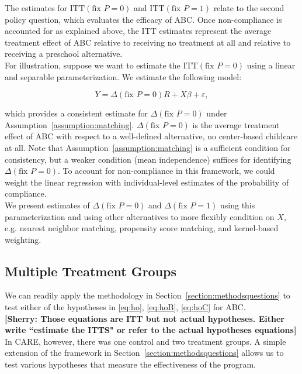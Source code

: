 \noindent The estimates for $\text{ITT} \left( \text{fix } P = 0 \right) $ and $\text{ITT} \left( \text{fix } P = 1 \right)$ relate to the second policy question, which evaluates the efficacy of ABC. Once non-compliance is accounted for as explained above, the ITT estimates represent the average treatment effect of ABC relative to receiving no treatment at all and relative to receiving a preschool alternative.\\

\noindent For illustration, suppose we want to estimate the $\text{ITT} \left( \text{fix } P = 0 \right)$ using a linear and separable parameterization. We estimate the following model: 

\begin{equation}
Y = \Delta \left( \text{fix } P = 0 \right) R + X \beta + \varepsilon, 
\end{equation}

\noindent which provides a consistent estimate for $\Delta \left( \text{fix } P = 0 \right)$ under Assumption~\ref{assumption:matching}. $\Delta \left( \text{fix } P = 0 \right)$ is the average treatment effect of ABC with respect to a well-defined alternative, no center-based childcare at all. Note that Assumption~\ref{assumption:matching} is a sufficient condition for consistency, but a weaker condition (mean independence) suffices for identifying $\Delta \left( \text{fix } P = 0 \right)$. To account for non-compliance in this framework, we could weight the linear regression with individual-level estimates of the probability of compliance.\\

\noindent We present estimates of $\Delta \left( \text{fix } P = 0 \right)$ and $\Delta \left( \text{fix } P = 1 \right)$ using this parameterization and using other alternatives to more flexibly  condition on $X$, e.g. nearest neighbor matching, propensity score matching, and kernel-based weighting.

\subsection{Multiple Treatment Groups}

\noindent We can readily apply the methodology in Section~\ref{section:methodsquestions}  to test either of the hypotheses in \eqref{eq:ho}, \eqref{eq:hoB}, \eqref{eq:hoC} for ABC.\\

\textbf{[Sherry: Those equations are ITT but not actual hypotheses. Either write ``estimate the ITTS" or refer to the actual hypotheses equations]} In CARE, however, there was one control and two treatment groups. A simple extension of the framework in Section~\ref{section:methodsquestions} allows us to test various hypotheses that measure the effectiveness of the program.\\

